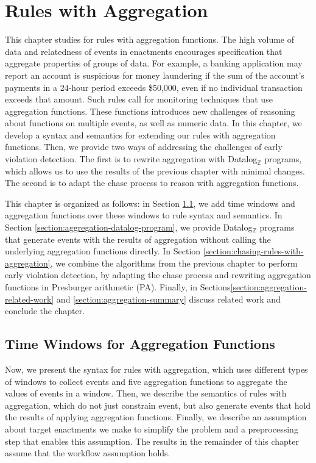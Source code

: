\chapter{Rules with Aggregation}
\label{chapter:aggregation}

This chapter studies
for rules with aggregation functions.
The high volume of data and relatedness of events in enactments
encourages specification that aggregate properties of groups of data.
For example,
a banking application may report an account is suspicious for money laundering
if the sum of the account's payments in a 24-hour period exceeds \$50,000,
even if no individual transaction exceeds that amount.
Such rules
call for monitoring techniques
that use aggregation functions.
These functions
introduces new challenges
of reasoning about functions on multiple events,
as well as numeric data.
In this chapter, we develop a syntax and semantics
for extending our rules with aggregation functions.
Then,
we provide two ways of addressing the challenges
of early violation detection.
The first is to rewrite aggregation
with Datalog$_{\mathbb{Z}}$ programs,
which allows us to use the results of the previous chapter
with minimal changes.
The second is to adapt the chase process
to reason with aggregation functions.

This chapter is organized as follows:
in Section \ref{section:aggregation-definitions},
we add time windows and aggregation functions over these windows
to rule syntax and semantics.
In Section \ref{section:aggregation-datalog-program},
we provide Datalog$_{\mathbb{Z}}$ programs that generate events
with the results of aggregation
without calling the underlying aggregation functions directly.
In Section \ref{section:chasing-rules-with-aggregation},
we combine the algorithms from the previous chapter 
to perform early violation detection,
by adapting the chase process
and rewriting aggregation functions in Presburger arithmetic (PA).
Finally,
in Sections\:\ref{section:aggregation-related-work} and \ref{section:aggregation-summary}
discuss related work and conclude the chapter.

\section{Time Windows for Aggregation Functions}
\label{section:aggregation-definitions}

Now, we present the syntax for rules with aggregation,
which uses different types of windows
to collect events
and five aggregation functions
to aggregate the values of events in a window.
Then,
we describe the semantics of rules with aggregation,
which do not just constrain event, but also generate events
that hold the results of applying aggregation functions.
Finally,
we describe an assumption about target enactments
we make to simplify the problem
and a preprocessing step
that enables this assumption.
The results in the remainder of this chapter
assume that the workflow assumption holds.

